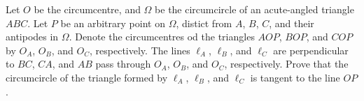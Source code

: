 Let $O$ be the circumcentre, and $\Omega$ be the circumcircle of an acute-angled triangle $ABC$. Let $P$ be an arbitrary point on $\Omega$, distict from $A$, $B$, $C$, and their antipodes in $\Omega$. Denote the circumcentres od the triangles $AOP$, $BOP$, and $COP$ by $O_A$, $O_B$, and $O_C$, respectively. The lines $\ell_A$, $\ell_B$, and $\ell_C$ are perpendicular to $BC$, $CA$, and $AB$ pass through $O_A$, $O_B$, and $O_C$, respectively. Prove that the circumcircle of the triangle formed by $\ell_A$, $\ell_B$, and $\ell_C$ is tangent to the line $OP$.